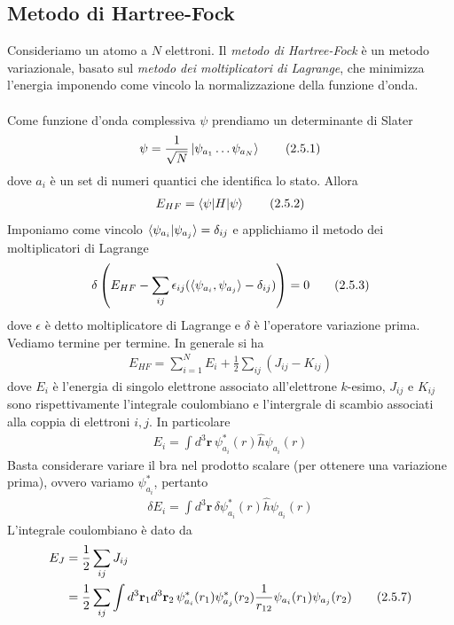 \documentclass{article}
\begin{document}
\subsection{Metodo di Hartree-Fock}
Consideriamo un atomo a $N$ elettroni. Il \textit{metodo di Hartree-Fock} è un metodo variazionale, basato sul \textit{metodo dei moltiplicatori di Lagrange}, che minimizza l'energia imponendo come vincolo la normalizzazione della funzione d'onda. \\ \\
Come funzione d'onda complessiva $\psi$ prendiamo un determinante di Slater
\begin{align}
    \psi = \frac{1}{\sqrt{N}}\ket{\psi_{a_1} \dots \psi_{a_N}} \tag{2.5.1}
\end{align}
dove $a_i$ è un set di numeri quantici che identifica lo stato. Allora
\begin{align}
    E_{HF} = \braket{\psi|H|\psi} \tag{2.5.2}
\end{align}
Imponiamo come vincolo $\braket{\psi_{a_i}|\psi_{a_j}} = \delta_{ij}$ e applichiamo il metodo dei moltiplicatori di Lagrange
\begin{align}
    \delta\left(E_{HF} - \sum_{ij}\epsilon_{ij}(\braket{\psi_{a_i}, \psi_{a_j}} - \delta_{ij})\right) = 0 \tag{2.5.3}
\end{align}
dove $\epsilon$ è detto moltiplicatore di Lagrange e $\delta$ è l'operatore variazione prima. \\
Vediamo termine per termine. In generale si ha
\begin{align}
    E_{HF} = \sum_{i = 1}^N E_i + \frac{1}{2}\sum_{ij}(J_{ij} - K_{ij}) \tag{2.5.4}
\end{align}
dove $E_i$ è l'energia di singolo elettrone associato all'elettrone $k$-esimo, $J_{ij}$ e $K_{ij}$ sono rispettivamente l'integrale coulombiano e l'intergrale di scambio associati alla coppia di elettroni $i, j$. In particolare 
\begin{align}
    E_i = \int d^3\mathbf{r} \, \psi^*_{a_i}(r)\hat{h}\psi_{a_i}(r) \tag{2.5.5}
\end{align}
Basta considerare variare il bra nel prodotto scalare (per ottenere una variazione prima), ovvero variamo $\psi^*_{a_i}$, pertanto 
\begin{align}
    \delta E_i = \int d^3\mathbf{r} \, \delta \psi^*_{a_i}(r)\hat{h}\psi_{a_i}(r) \tag{2.5.6}
\end{align}
L'integrale coulombiano è dato da 
\begin{align}
    E_J &= \frac{1}{2}\sum_{ij} J_{ij} \notag \\ 
    &= \frac{1}{2}\sum_{ij} \int d^3\mathbf{r}_1d^3\mathbf{r}_2 \, \psi^*_{a_i}(r_1)\psi^*_{a_j}(r_2)\frac{1}{r_{12}}\psi_{a_i}(r_1)\psi_{a_j}(r_2) \tag{2.5.7}
\end{align}
\end{document}
